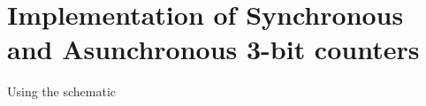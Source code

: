 \documentclass{article}
\begin{document}
    \section{Implementation of Synchronous and Asunchronous 3-bit counters}
    Using the schematic
\end{document}
